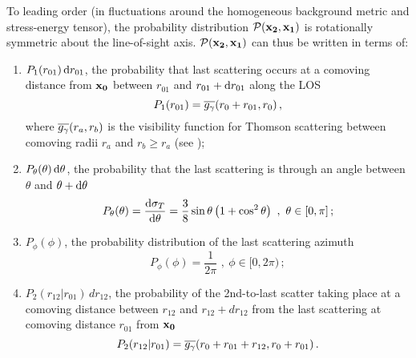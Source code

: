 \documentclass[fleqn,usenatbib]{mnras}
\begin{document}
    To leading order (in fluctuations around the homogeneous background metric
    and stress-energy tensor), the probability distribution $\mathcal{P}(\mathbf{x_2},
    \mathbf{x_1})$ is rotationally symmetric about the line-of-sight axis.
    $\mathcal{P}(\mathbf{x_2},\mathbf{x_1})$ can thus be written in terms of:

    \begin{enumerate}[leftmargin=*]
        \item
            $P_1(r_{01})\,\dif{r_{01}}$, the probability that last scattering
            occurs at a comoving distance from $\mathbf{x_0}$ between $r_{01}$ and
            $r_{01}+\dif{r_{01}}$ along the LOS
            \begin{equation}  \label{eq:P1r1}
                P_1(r_{01}) = \overline{g_\gamma}(r_0 + r_{01},r_0)\,,
            \end{equation}
            where $\overline{g_\gamma}(r_a,r_b)$ is the visibility function for Thomson
            scattering between comoving radii $r_a$ and $r_b\geq r_a$ (see
            );
        \item
            $P_\theta(\theta)\,\dif{\theta}$, the probability that the last
            scattering is through an angle between $\theta$ and
            $\theta+\dif{\theta}$
            \begin{equation} \label{eq:Ptheta}
                P_\theta(\theta)
                    = \frac{\dif{\sigma_T}}{\dif{\theta}}
                    = \frac{3}{8}\sin\theta\left(1+\cos^2\theta\right)
                      \,\,,\ \theta \in [0, \pi]\,;
            \end{equation}
        \item
            $P_\phi(\phi)$, the probability distribution of the last scattering
            azimuth
            \begin{equation} \label{eq:Pphi}
               P_\phi(\phi) = \frac{1}{2\pi} \,\,,\ \phi \in [0, 2\pi)\,;
            \end{equation}
        \item
            $P_2(r_{12}|r_{01}) \, dr_{12}$, the probability of the 2nd-to-last
            scatter taking place at a comoving distance between $r_{12}$ and
            $r_{12} + dr_{12}$ from the last scattering at comoving distance
            $r_{01}$ from $\mathbf{x_0}$
            \begin{equation} \label{eq:P2r12_given_r1}
                P_2(r_{12}|r_{01}) = \overline{g_\gamma}(r_0 + r_{01}+r_{12},r_0 + r_{01})\,.
            \end{equation}
    \end{enumerate}
\end{document}
